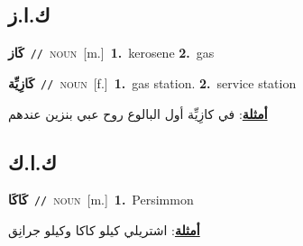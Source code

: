 \documentclass[10pt,a4paper,twoside]{article} %
\begin{document}
\begin{multicols}{2}
\vspace{-3mm}
\subsection*{\color{blue}\foreignlanguage{arabic}{ك.ا.ز}\color{blue}{ (ntws)}} 

{\setlength\topsep{0pt}\textbf{\foreignlanguage{arabic}{كَاز}}\ {\color{gray}\texttt{//}\color{black}}\ \textsc{noun}\ [m.]\ \textbf{1.}~kerosene  \textbf{2.}~gas\ } \vspace{2mm}

{\setlength\topsep{0pt}\textbf{\foreignlanguage{arabic}{كَازِيِّة}}\ {\color{gray}\texttt{//}\color{black}}\ \textsc{noun}\ [f.]\ \textbf{1.}~gas station.  \textbf{2.}~service station\  \begin{flushright}\color{gray}\foreignlanguage{arabic}{\textbf{\underline{\foreignlanguage{arabic}{أمثلة}}}: في كازِيِّة أول البالوع روح عبي بنزين عندهم}\end{flushright}\color{black}} \vspace{2mm}

\vspace{-3mm}
\subsection*{\color{blue}\foreignlanguage{arabic}{ك.ا.ك}\color{blue}{ (ntws)}} 

{\setlength\topsep{0pt}\textbf{\foreignlanguage{arabic}{كَاكَا}}\ {\color{gray}\texttt{//}\color{black}}\ \textsc{noun}\ [m.]\ \textbf{1.}~Persimmon\  \begin{flushright}\color{gray}\foreignlanguage{arabic}{\textbf{\underline{\foreignlanguage{arabic}{أمثلة}}}: اشتريلي كيلو كاكا وكيلو جرانِق}\end{flushright}\color{black}} \vspace{2mm}


\end{multicols}
\end{document}
